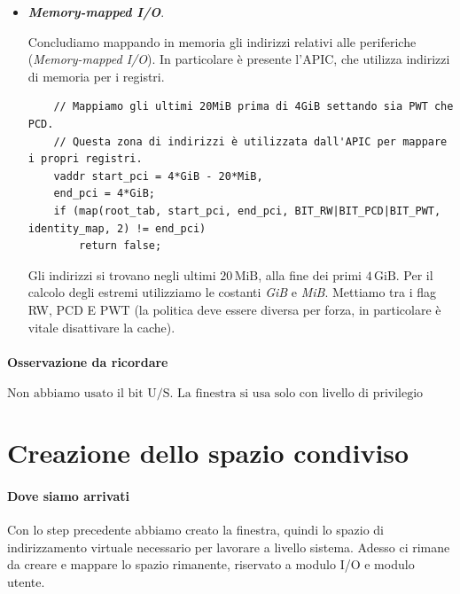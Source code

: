 \documentclass[11pt]{report}
\theoremstyle{definition}
\begin{document}
\begin{itemize}
	\item \textbf{\emph{Memory-mapped I/O}}.
	
	Concludiamo mappando in memoria gli indirizzi relativi alle periferiche (\emph{Memory-mapped I/O}). In particolare è presente l'APIC, che utilizza indirizzi di memoria per i registri. 
	\small
	\begin{verbatim}
	// Mappiamo gli ultimi 20MiB prima di 4GiB settando sia PWT che PCD.
	// Questa zona di indirizzi è utilizzata dall'APIC per mappare i propri registri.
	vaddr start_pci = 4*GiB - 20*MiB,
	end_pci = 4*GiB;
	if (map(root_tab, start_pci, end_pci, BIT_RW|BIT_PCD|BIT_PWT, identity_map, 2) != end_pci)
	    return false;
	\end{verbatim}
\normalsize 
	Gli indirizzi si trovano negli ultimi $20\,\text{MiB}$, alla fine dei primi $4\,\text{GiB}$. Per il calcolo degli estremi utilizziamo le costanti \emph{GiB} e \emph{MiB}. Mettiamo tra i flag RW, PCD E PWT (la politica deve essere diversa per forza, in particolare è vitale disattivare la cache).
\end{itemize}
\paragraph{Osservazione da ricordare}
\[\boxed{\text{Non abbiamo usato il bit U/S. La finestra si usa solo con livello di privilegio sistema.}}\]
\clearpage 
	
	
\section{Creazione dello spazio condiviso}
\paragraph{Dove siamo arrivati} Con lo step precedente abbiamo creato la finestra, quindi lo spazio di indirizzamento virtuale necessario per lavorare a livello sistema. Adesso ci rimane da creare e mappare lo spazio rimanente, riservato a modulo I/O e modulo utente.
\end{document}
